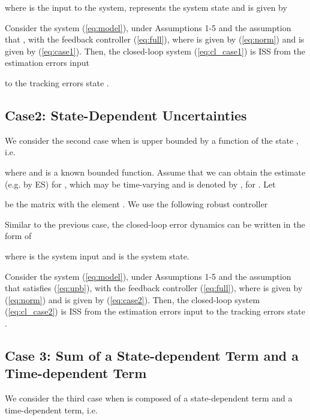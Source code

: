 \documentclass[twoside,leqno,onecolumn]{article}
\begin{document}
where  is the input to the system,  represents
the system state and  is given by

\begin{theorem}
\label{thm:case1} Consider the system (\ref{eq:model}), under
Assumptions 1-5 and the assumption that , with the feedback controller
(\ref{eq:full}), where  is given by (\ref{eq:norm}) and 
is given by (\ref{eq:case1}). Then, the closed-loop system
(\ref{eq:cl_case1}) is ISS from the estimation errors input

 to the tracking errors state .
\end{theorem}




\subsection{Case2: State-Dependent Uncertainties}
\label{sec:case2} We consider the second case when  is upper bounded by a function of the state
, i.e.

where  and  is a known
bounded function. Assume that we can obtain the estimate (e.g. by
ES) for , which may be time-varying and is denoted by
, for . Let

be the matrix with the element .
We use the following robust controller

Similar to the previous case, the closed-loop error dynamics can
be written in the form of

where  is the system input and  is the system
state.



\begin{theorem}
\label{thm:case2}
Consider the system (\ref{eq:model}), under Assumptions 1-5 and
the assumption that  satisfies (\ref{eq:upb}),
with the feedback controller (\ref{eq:full}), where  is given
by (\ref{eq:norm}) and  is given by (\ref{eq:case2}). Then,
the closed-loop system (\ref{eq:cl_case2}) is ISS from the
estimation errors input  to
the tracking errors state .
\end{theorem}





\subsection{Case 3: Sum of a State-dependent Term and a Time-dependent Term}
\label{sec:case3} We consider the third case when  is composed of a  state-dependent term and a
time-dependent term, i.e.
\end{document}
